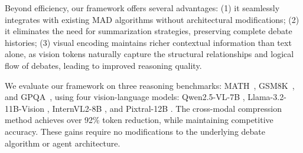 \documentclass{article}
\theoremstyle{plain}
\theoremstyle{definition}
\theoremstyle{remark}
\begin{document}
Beyond efficiency, our framework offers several advantages: (1) it seamlessly integrates with existing MAD algorithms without architectural modifications; (2) it eliminates the need for summarization strategies, preserving complete debate histories; (3) visual encoding maintains richer contextual information than text alone, as vision tokens naturally capture the structural relationships and logical flow of debates, leading to improved reasoning quality.

We evaluate our framework on three reasoning benchmarks: MATH~\cite{hendrycks2020measuring}, 
GSM8K~\cite{cobbe2021training}, and GPQA~\cite{rein2024gpqa}, using four vision-language 
models: Qwen2.5-VL-7B \cite{bai2025qwen2}, Llama-3.2-11B-Vision \cite{meta2024llama}, InternVL2-8B \cite{chen2024internvl}, and Pixtral-12B \cite{agrawal2024pixtral}. The cross-modal compression method achieves over 92\% token reduction, while maintaining competitive accuracy. These gains 
require no modifications to the underlying debate algorithm or agent architecture.


\end{document}
